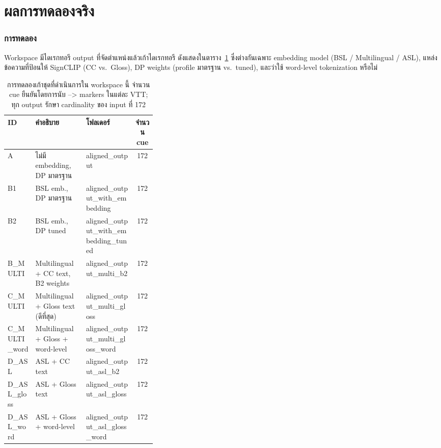 \documentclass[11pt,a4paper]{article}
\def\texttt#1{#1}%
\def\textbf#1{#1}%
\def\emph#1{#1}%
\begin{document}
\clearpage
\part{ผลการทดลองจริง}

\section{การทดลอง}
\label{sec:exp}

Workspace มีไดเรกทอรี output ที่จัดตำแหน่งแล้วเก้าไดเรกทอรี
ดังแสดงในตาราง~\ref{tab:exp-list} ซึ่งต่างกันเฉพาะ embedding model
(BSL / Multilingual / ASL), แหล่งข้อความที่ป้อนให้ SignCLIP (CC vs.\ Gloss),
DP weights (profile \emph{มาตรฐาน} vs.\ \emph{tuned}),
และว่าใช้ word-level tokenization หรือไม่

\begin{table}[h]
\centering
\small
\begin{tabularx}{\linewidth}{@{}l p{0.34\linewidth}
                              >{\raggedright\arraybackslash}X
                              c@{}}
\toprule
\textbf{ID} & \textbf{คำอธิบาย} & \textbf{โฟลเดอร์} & \textbf{จำนวน cue} \\
\midrule
A                 & ไม่มี embedding, DP มาตรฐาน              & \texttt{aligned\_output}                         & 172 \\
B1                & BSL emb., DP มาตรฐาน                     & \texttt{aligned\_output\_with\_embedding}        & 172 \\
B2                & BSL emb., DP \emph{tuned}                & \texttt{aligned\_output\_with\_embedding\_tuned} & 172 \\
B\_MULTI          & Multilingual + CC text, B2 weights       & \texttt{aligned\_output\_multi\_b2}              & 172 \\
\textbf{C\_MULTI} & \textbf{Multilingual + Gloss text (ดีที่สุด)} & \texttt{aligned\_output\_multi\_gloss}      & 172 \\
C\_MULTI\_word    & Multilingual + Gloss + word-level        & \texttt{aligned\_output\_multi\_gloss\_word}     & 172 \\
D\_ASL            & ASL + CC text                            & \texttt{aligned\_output\_asl\_b2}                & 172 \\
D\_ASL\_gloss     & ASL + Gloss text                         & \texttt{aligned\_output\_asl\_gloss}             & 172 \\
D\_ASL\_word      & ASL + Gloss + word-level                 & \texttt{aligned\_output\_asl\_gloss\_word}       & 172 \\
\bottomrule
\end{tabularx}
\caption{การทดลองเก้าชุดที่ดำเนินการใน workspace นี้
จำนวน cue ยืนยันโดยการนับ \texttt{-->} markers ในแต่ละ VTT;
ทุก output รักษา cardinality ของ input ที่ 172}
\label{tab:exp-list}
\end{table}
\end{document}
